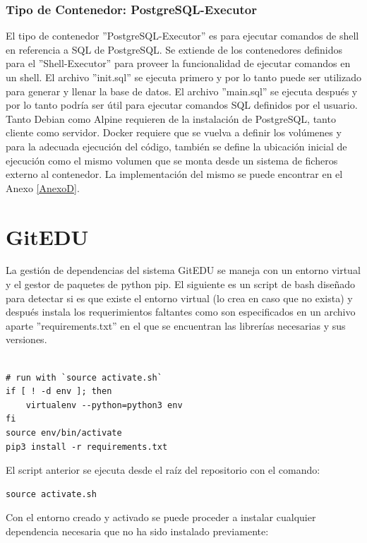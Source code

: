 \subsubsection{Tipo de Contenedor: PostgreSQL-Executor}
El tipo de contenedor ''PostgreSQL-Executor'' es para ejecutar comandos de shell en referencia a SQL de PostgreSQL. Se extiende de los contenedores definidos para el ''Shell-Executor'' para proveer la funcionalidad de ejecutar comandos en un shell. El archivo ''init.sql'' se ejecuta primero y por lo tanto puede ser utilizado para generar y llenar la base de datos. El archivo ''main.sql'' se ejecuta después y por lo tanto podría ser útil para ejecutar comandos SQL definidos por el usuario. Tanto Debian como Alpine requieren de la instalación de PostgreSQL, tanto cliente como servidor. Docker requiere que se vuelva a definir los volúmenes y para la adecuada ejecución del código, también se define la ubicación inicial de ejecución como el mismo volumen que se monta desde un sistema de ficheros externo al contenedor. La implementación del mismo se puede encontrar en el Anexo \ref{AnexoD}.

\section{GitEDU}

La gestión de dependencias del sistema GitEDU se maneja con un entorno virtual y el gestor de paquetes de python pip. El siguiente es un script de bash diseñado para detectar si es que existe el entorno virtual (lo crea en caso que no exista) y después instala los requerimientos faltantes como son especificados en un archivo aparte ''requirements.txt'' en el que se encuentran las librerías necesarias y sus versiones.

\begin{lstlisting}

# run with `source activate.sh` 
if [ ! -d env ]; then
	virtualenv --python=python3 env
fi
source env/bin/activate
pip3 install -r requirements.txt

\end{lstlisting}

El script anterior se ejecuta desde el raíz del repositorio con el comando:

\begin{lstlisting}
source activate.sh
\end{lstlisting}

Con el entorno creado y activado se puede proceder a instalar cualquier dependencia necesaria que no ha sido instalado previamente:


